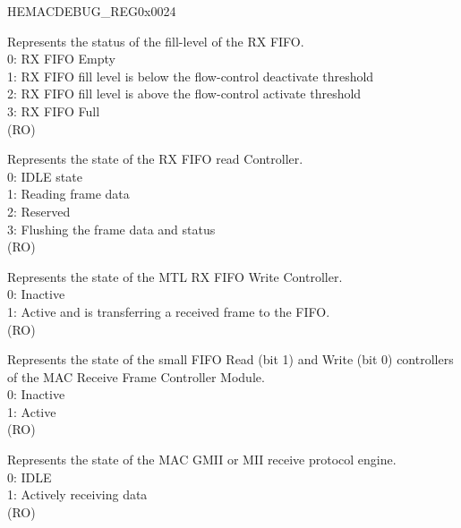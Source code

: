 \begin{register}{H}{EMACDEBUG\_REG}{0x0024}
\begin{regdesc}\begin{reglist}
\item[Continued from the previous page...]

\item [MTLRFFLS] Represents the status of the fill-level of the RX FIFO.\\
0: RX FIFO Empty\\
1: RX FIFO fill level is below the flow-control deactivate threshold\\
2: RX FIFO fill level is above the flow-control activate threshold\\
3: RX FIFO Full\\
(RO)
\item [MTLRFRCS] Represents the state of the RX FIFO read Controller.\\
0: IDLE state\\
1: Reading frame data\\
2: Reserved\\
3: Flushing the frame data and status\\
(RO)
\item [MTLRFWCAS] Represents the state of the MTL RX FIFO Write Controller.\\
0: Inactive\\
1: Active and is transferring a received frame to the FIFO.\\(RO)
\item [MACRFFCS] Represents the state of the small FIFO Read (bit 1) and Write (bit 0) controllers of the MAC Receive Frame Controller Module.\\
0: Inactive\\
1: Active\\(RO)
\item [MACRPES] Represents the state of the MAC GMII or MII receive protocol engine.\\
0: IDLE\\
1: Actively receiving data\\(RO)
\end{reglist}\end{regdesc}
\end{register}


